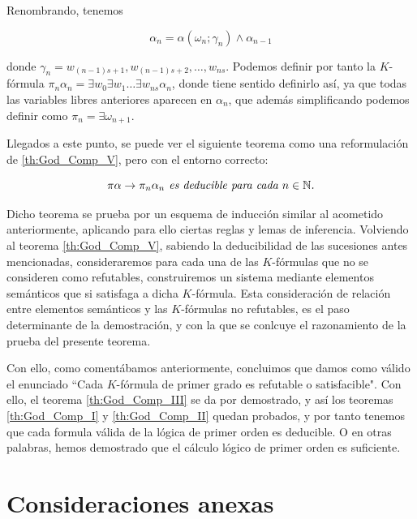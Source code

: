 Renombrando, tenemos 

$$\alpha_n = \alpha(\omega_{n}; \gamma_n) \land \alpha_{n-1}$$

donde $\gamma_n = w_{(n-1)s+1}, w_{(n-1)s+2}, \dots, w_{ns}$. Podemos definir por tanto la $K$-fórmula $\pi_n \alpha_n = \exists w_0 \exists w_1 \dots \exists w_{ns} \alpha_n$, donde tiene sentido
definirlo así, ya que todas las variables libres anteriores aparecen en $\alpha_n$, que además simplificando podemos definir como $\pi_n = \exists \omega_{n+1}$.

Llegados a este punto, se puede ver el siguiente teorema como una reformulación de \eqref{th:God_Comp_V}, pero con el entorno correcto:


\begin{equation}\label{th:God_Comp_VI}
    \textit{$\pi \alpha \rightarrow \pi_n \alpha_n$ es deducible para cada $n \in \mathbb{N}$.}
\end{equation}

Dicho teorema se prueba por un esquema de inducción similar al acometido anteriormente, aplicando para ello ciertas reglas y lemas de inferencia. Volviendo al teorema \eqref{th:God_Comp_V}, sabiendo la deducibilidad de las sucesiones
antes mencionadas, consideraremos para cada una de las $K$-fórmulas que no se consideren como refutables, construiremos un sistema mediante elementos semánticos que si satisfaga a dicha $K$-fórmula.
Esta consideración de relación entre elementos semánticos y las $K$-fórmulas no refutables, es el paso determinante de la demostración, y con la que se conlcuye el razonamiento de la prueba del
presente teorema.

Con ello, como comentábamos anteriormente, concluimos que damos como válido el enunciado ``Cada $K$-fórmula de primer grado es refutable o satisfacible". Con ello, el teorema \eqref{th:God_Comp_III} se 
da por demostrado, y así los teoremas \eqref{th:God_Comp_I} y \eqref{th:God_Comp_II} quedan probados, y por tanto tenemos que cada formula válida de la lógica de primer orden es deducible. O en otras 
palabras, hemos demostrado que el cálculo lógico de primer orden es suficiente.

\section{Consideraciones anexas}

